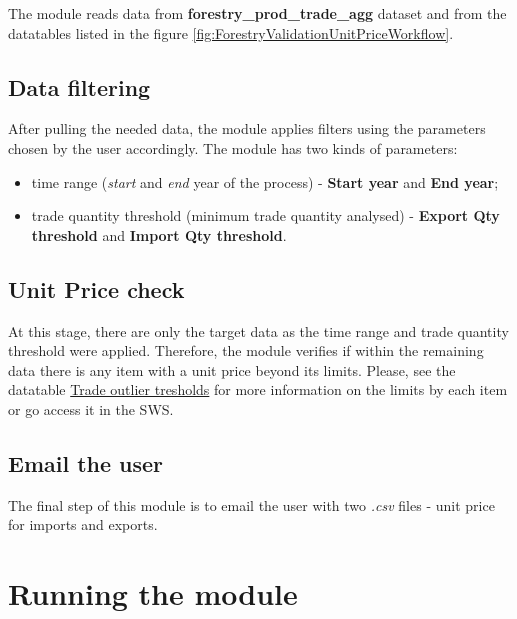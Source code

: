 \documentclass[
]{book}
\providecommand{\tightlist}{%
  \setlength{\itemsep}{0pt}\setlength{\parskip}{0pt}}
\begin{document}
The module reads data from \textbf{forestry\_prod\_trade\_agg} dataset and from the datatables listed in the figure \ref{fig:ForestryValidationUnitPriceWorkflow}.

\hypertarget{data-filtering-2}{%
\subsection{Data filtering}\label{data-filtering-2}}

After pulling the needed data, the module applies filters using the parameters chosen by the user accordingly. The module has two kinds of parameters:

\begin{itemize}
\tightlist
\item
  time range (\emph{start} and \emph{end} year of the process) - \textbf{Start year} and \textbf{End year};
\item
  trade quantity threshold (minimum trade quantity analysed) - \textbf{Export Qty threshold} and \textbf{Import Qty threshold}.
\end{itemize}

\hypertarget{unit-price-check}{%
\subsection{Unit Price check}\label{unit-price-check}}

At this stage, there are only the target data as the time range and trade quantity threshold were applied. Therefore, the module verifies if within the remaining data there is any item with a unit price beyond its limits. Please, see the datatable \protect\hyperlink{trade-outlier-tresholds}{Trade outlier tresholds} for more information on the limits by each item or go access it in the SWS.

\hypertarget{email-the-user-2}{%
\subsection{Email the user}\label{email-the-user-2}}

The final step of this module is to email the user with two \emph{.csv} files - unit price for imports and exports.

\hypertarget{running-the-module-6}{%
\section{\texorpdfstring{\textbf{Running the module}}{Running the module}}\label{running-the-module-6}}
\end{document}
